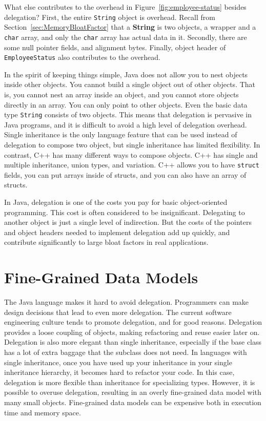 \documentclass{book}
\theoremstyle{definition}
\begin{document}
What else contributes to the overhead in Figure~\ref{fig:employee-status} besides delegation?  First, the entire \texttt{String} object is overhead. Recall from Section~\ref{sec:MemoryBloatFactor} that a \textbf{String} is two objects, a wrapper and a \texttt{char} array, and only the \texttt{char} array has actual data in it. Secondly, there are some null pointer fields, and alignment bytes. Finally, object header of \texttt{EmployeeStatus} also contributes to the overhead.

In the spirit of keeping things simple, Java does not allow you to nest objects inside other objects. You cannot build a single object out of other objects. That is, you cannot nest an array inside an object, and you cannot store objects directly in an array.  You can only point to other objects. Even the basic data type \texttt{String} consists of two objects. This means that delegation is pervasive in Java programs, and it is difficult to avoid a high level of delegation overhead. Single inheritance is the only language feature that can be used instead of delegation to compose two object, but single inheritance has limited flexibility.  In contrast, C++ has many different ways to compose objects. C++ has single and multiple inheritance, union types, and variation. C++ allows you to have \texttt{struct} fields, you can put arrays inside of structs, and you can also have an array of structs.  

In Java, delegation is one of the costs you pay for basic object-oriented programming. This cost is often considered to be insignificant. Delegating to another object is just a single level of indirection. But the costs of the pointers and object headers needed to implement delegation add up quickly, and contribute significantly to large bloat factors in real applications.

\section{Fine-Grained Data Models}
\label{fine-grained-data-models}

The Java language makes it hard to avoid delegation. Programmers can make design decisions that lead to even more delegation. 
The current software engineering culture tends to promote delegation, and for good reasons. Delegation provides a loose coupling of objects, making refactoring and reuse easier later on. Delegation is also more elegant than single inheritance, especially if the base class has a lot of extra baggage that the subclass does not need. In languages with single inheritance, once you have used up your inheritance in your single inheritance hierarchy, it becomes hard to refactor your code. In this case, delegation is more flexible than inheritance for specializing types. However, it is possible to overuse delegation, resulting in an overly fine-grained data model with many small objects. Fine-grained data models can be expensive both in execution time and memory space. 
\end{document}
